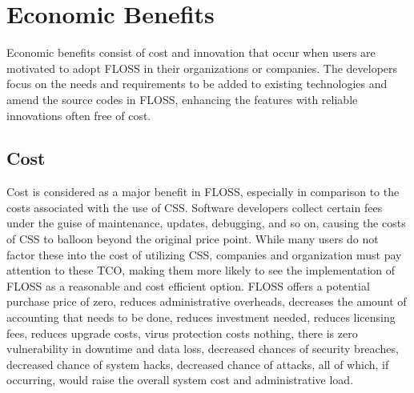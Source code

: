   \section{Economic Benefits}
  Economic benefits consist of cost and innovation that occur when users are motivated to adopt FLOSS in their organizations or companies. The developers focus on the needs and requirements to be added to existing technologies and amend the source codes in FLOSS, enhancing the features with reliable innovations often free of cost. 
  
  \subsection {Cost}
  
  Cost is considered as a major benefit in FLOSS, especially in comparison to the costs associated with the use of CSS. Software developers collect certain fees under the guise of maintenance, updates, debugging, and so on, causing the costs of CSS to balloon beyond the original price point. While many users do not factor these into the cost of utilizing CSS, companies and organization must pay attention to these \ac{TCO}, making them more likely to see the implementation of FLOSS as a reasonable and cost efficient option. FLOSS offers a potential purchase price of zero, reduces administrative overheads, decreases the amount of accounting that needs to be done, reduces investment needed, reduces licensing fees, reduces upgrade costs, virus protection costs nothing, there is zero vulnerability in downtime and data loss, decreased chances of security breaches, decreased chance of system hacks, decreased chance of attacks, all of which, if occurring, would raise the overall system cost and administrative load. 
  
